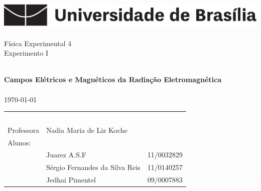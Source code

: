 \begin{titlepage}
\begin{center}

\includegraphics[width=\textwidth]{logo_unb.pdf}~\\[1cm]

\Huge Física Experimental 4\\[0.5cm]

\huge Experimento I

\HRule \\[0.4cm]
{ \huge \bfseries  Campos Elétricos e Magnéticos da Radiação Eletromagnética}\\[0.4cm]

\HRule \\[0.5cm]

{\large \today}


\vfill %



	\begin{center} \large
		\begin{tabular}{llr} \
		& & \\[0.05cm]		
		Professora & Nadia Maria de Liz Koche & \\
		
		Alunos:& & \\
		& Juarez A.S.F 					& 11/0032829\\
		& Sérgio Fernandes da Silva Reis & 11/0140257\\
		& Jedhai Pimentel				& 09/0007883\\	[0.05cm]	
		\end{tabular}

	
	\end{center}


\end{center}
\end{titlepage}